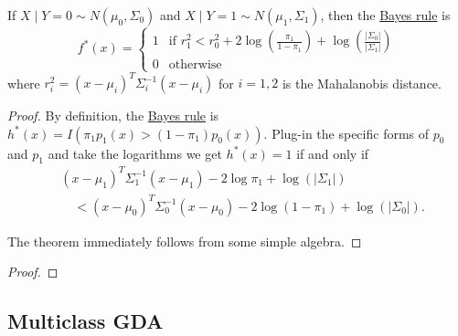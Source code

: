   \begin{theorem}
    \label{thm:bayes-rule-for-two-gaussian-classes}
    If $X \mid Y = 0 \sim N(\mu_0, \Sigma_0)$ and $X \mid Y = 1 \sim N(\mu_1, \Sigma_1)$, then the \hyperref[prob-thm:bayes-rule]{Bayes rule} is
    \begin{equation}
      f^{\ast}(x) = \begin{cases}
        1 & \text{if } r_1^2 < r_0^2 + 2\log\left(\frac{\pi_1}{1-\pi_1}\right) + \log\left(\frac{|\Sigma_0|}{|\Sigma_1|}\right) \\
        0 & \text{otherwise}
      \end{cases}
    \end{equation}
    where $r_i^2 = (x - \mu_i)^T \Sigma_i^{-1} (x - \mu_i)$ for $i = 1, 2$ is the Mahalanobis distance.
  \end{theorem}
  \begin{proof}
    By definition, the \hyperref[prob-thm:bayes-rule]{Bayes rule} is $h^{\ast}(x) = I(\pi_1 p_1(x) > (1 - \pi_1)p_0(x))$. Plug-in the specific forms of $p_0$ and $p_1$ and take the logarithms we get $h^{\ast}(x) = 1$ if and only if
    \begin{align}
      &(x - \mu_1)^T \Sigma_1^{-1} (x - \mu_1) - 2\log\pi_1 + \log(|\Sigma_1|) \\
      &\quad < (x - \mu_0)^T \Sigma_0^{-1} (x - \mu_0) - 2\log(1 - \pi_1) + \log(|\Sigma_0|).
    \end{align}
    
    The theorem immediately follows from some simple algebra.
  \end{proof} 

  \begin{theorem}
    \label{thm:decision-boundary-is-quadratic}
    
  \end{theorem}
  \begin{proof}
    
  \end{proof}

\subsection{Multiclass GDA} 

